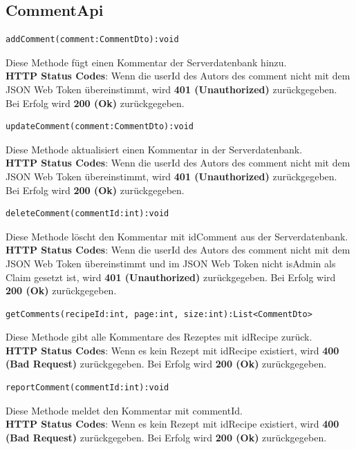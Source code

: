 \subsection{CommentApi}

\vspace{1cm}  
 \begin{lstlisting}
addComment(comment:CommentDto):void
\end{lstlisting}
Diese Methode fügt einen Kommentar der Serverdatenbank hinzu.\\
\textbf{HTTP Status Codes}:
Wenn die userId des Autors des comment nicht mit dem JSON Web Token übereinstimmt, wird \textbf{401 (Unauthorized)} zurückgegeben. Bei Erfolg wird \textbf{200 (Ok)} zurückgegeben.
\vspace{1cm}  
 \begin{lstlisting}
updateComment(comment:CommentDto):void
\end{lstlisting}
Diese Methode aktualisiert einen Kommentar in der Serverdatenbank.\\
\textbf{HTTP Status Codes}:
Wenn die userId des Autors des comment nicht mit dem JSON Web Token übereinstimmt, wird \textbf{401 (Unauthorized)} zurückgegeben. Bei Erfolg wird \textbf{200 (Ok)} zurückgegeben.
\vspace{1cm}
 \begin{lstlisting}
deleteComment(commentId:int):void
\end{lstlisting}
Diese Methode löscht den Kommentar mit idComment aus der Serverdatenbank.\\
\textbf{HTTP Status Codes}:
Wenn die userId des Autors des comment nicht mit dem JSON Web Token übereinstimmt und im JSON Web Token nicht isAdmin als Claim gesetzt ist, wird \textbf{401 (Unauthorized)} zurückgegeben. Bei Erfolg wird \textbf{200 (Ok)} zurückgegeben.
\vspace{1cm}  
 \begin{lstlisting}
getComments(recipeId:int, page:int, size:int):List<CommentDto>
\end{lstlisting}
Diese Methode gibt alle Kommentare des Rezeptes mit idRecipe zurück.\\
\textbf{HTTP Status Codes}:
Wenn es kein Rezept mit idRecipe existiert, wird \textbf{400 (Bad Request)} zurückgegeben. Bei Erfolg wird \textbf{200 (Ok)} zurückgegeben.
\vspace{1cm}  
 \begin{lstlisting}
reportComment(commentId:int):void
\end{lstlisting}
Diese Methode meldet den Kommentar mit commentId.\\
\textbf{HTTP Status Codes}:
Wenn es kein Rezept mit idRecipe existiert, wird \textbf{400 (Bad Request)} zurückgegeben. Bei Erfolg wird \textbf{200 (Ok)} zurückgegeben.


